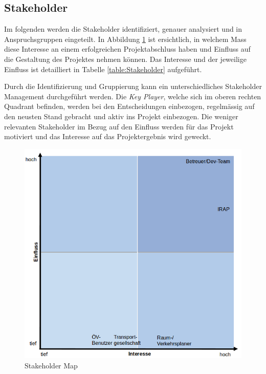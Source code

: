 \subsection{Stakeholder}
\label{Projektmanagement:Stakeholder}

Im folgenden werden die Stakeholder identifiziert, genauer analysiert und in Anspruchsgruppen eingeteilt.
In Abbildung \ref{fig:stakeholder_map} ist ersichtlich, in welchem Mass diese Interesse an einem erfolgreichen Projektabschluss haben und Einfluss auf die Gestaltung des Projektes nehmen können. 
Das Interesse und der jeweilige Einfluss ist detailliert in Tabelle \ref{table:Stakeholder} aufgeführt.

Durch die Identifizierung und Gruppierung kann ein unterschiedliches Stakeholder Management durchgeführt werden. 
Die \emph{Key Player}, welche sich im oberen rechten Quadrant befinden, werden bei den Entscheidungen einbezogen, regelmässig auf den neusten Stand gebracht und aktiv ins Projekt einbezogen.
Die weniger relevanten Stakeholder im Bezug auf den Einfluss werden für das Projekt motiviert und das Interesse auf das Projektergebnis wird geweckt.

\begin{figure}[ht]
\centering
\includegraphics[width=0.7\linewidth]{projectdoc/img/stakeholder_map}
\caption[Stakeholder Map]{Stakeholder Map}
\label{fig:stakeholder_map}
\end{figure}



